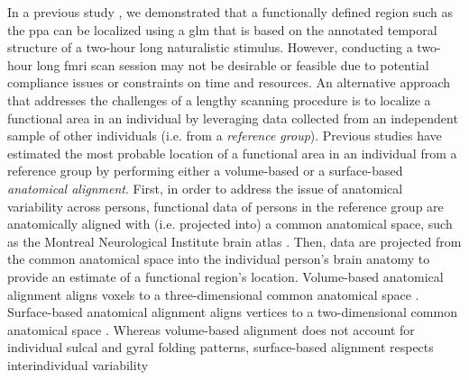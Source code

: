 In a previous study \citep{haeusler2022processing}, we demonstrated that a
functionally defined region such as the \ac{ppa} can be localized using  a
\acf{glm} that is based on the annotated temporal structure of a two-hour long
naturalistic stimulus.
However, conducting a two-hour long \ac{fmri} scan session may not be desirable
or feasible due to potential compliance issues or constraints on time and
resources.
An alternative approach that addresses the challenges of a lengthy scanning
procedure is to localize a functional area in an individual by leveraging data
collected from an independent sample of other individuals (i.e.  from a
\textit{reference group}).
Previous studies have estimated the most probable location of a functional area
in an individual from a reference group by performing either a volume-based
\citep{zhen2017quantifying, zhen2015quantifying} or a surface-based
\citep{frost2012measuring, weiner2018defining, rosenke2021probabilistic,
wang2015probabilistic} \textit{anatomical alignment}.
%
First, in order to address the issue of anatomical variability across persons,
functional data of persons in the reference group are anatomically aligned with
(i.e.  projected into) a common anatomical space, such as the Montreal
Neurological Institute brain atlas \citep[MNI152 atlas;][]{fonov2011unbiased}.
Then, data are projected from the common anatomical space into the individual
person's brain anatomy to provide an estimate of a functional region's location.
Volume-based anatomical alignment \citep[s.][for a review]{klein2009evaluation}
aligns voxels to a three-dimensional common anatomical space \citep[e.g., MNI152
atlas;][]{fonov2011unbiased}.
Surface-based anatomical alignment \citep{fischl1999cortical, yeo2009spherical}
aligns vertices to a two-dimensional common anatomical space \citep[e.g.,
FreeSurfer's fsaverage template;][]{fischl1999high}.
Whereas volume-based alignment does not account for individual sulcal and gyral
folding patterns, surface-based alignment respects interindividual variability
